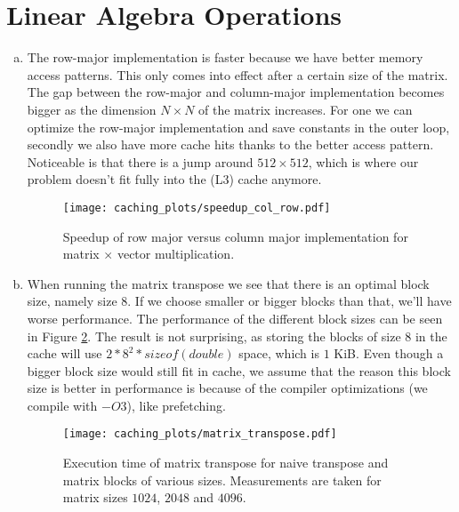 \documentclass[a4paper,10pt]{article} %
\begin{document}
\newpage

\section{Linear Algebra Operations}
\begin{enumerate}[a)]
\setcounter{enumi}{0}
\item
The row-major implementation is faster because we have better memory access patterns. This only comes into effect after a certain size of the matrix. The gap between the row-major and column-major implementation becomes bigger as the dimension $N \times N$ of the matrix increases. For one we can optimize the row-major implementation and save constants in the outer loop, secondly we also have more cache hits thanks to the better access pattern. Noticeable is that there is a jump around $512 \times 512$, which is where our problem doesn't fit fully into the (L3) cache anymore. 

\begin{figure}[h]
  \centering
  \begin{minipage}[t]{0.8\textwidth}
    \texttt{[image: caching\_plots/speedup\_col\_row.pdf]}
    \caption{Speedup of row major versus column major implementation for matrix $\times$ vector multiplication.}
    \label{fig:speed_col_row}
  \end{minipage}
\end{figure}

\item
When running the matrix transpose we see that there is an optimal block size, namely size $8$. If we choose smaller or bigger blocks than that, we'll have worse performance. The performance of the different block sizes can be seen in Figure \ref{fig:mat_transpose}. The result is not surprising, as storing the blocks of size $8$ in the cache will use $2*8^2 * sizeof(double)$ space, which is $1$ KiB. Even though a bigger block size would still fit in cache, we assume that the reason this block size is better in performance is because of the compiler optimizations (we compile with $-O3$), like prefetching.

\begin{figure}[]
  \centering
  \begin{minipage}[t]{0.8\textwidth}
    \texttt{[image: caching\_plots/matrix\_transpose.pdf]}
    \caption{Execution time of matrix transpose for naive transpose and matrix blocks of various sizes. Measurements are taken for matrix sizes $1024$, $2048$ and $4096$.}
    \label{fig:mat_transpose}
  \end{minipage}
\end{figure}


\end{enumerate}
\end{document}
